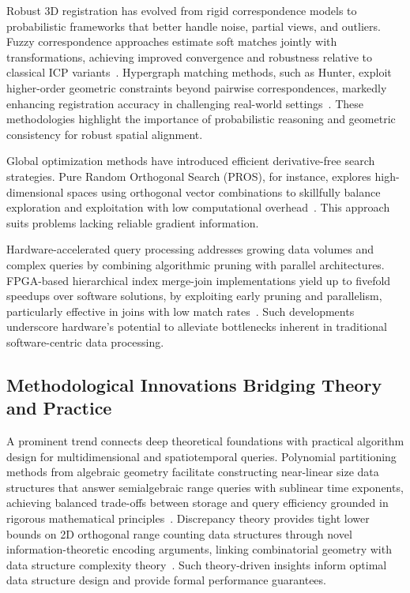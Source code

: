 \documentclass[11pt]{article}
\begin{document}
Robust 3D registration has evolved from rigid correspondence models to probabilistic frameworks that better handle noise, partial views, and outliers. Fuzzy correspondence approaches estimate soft matches jointly with transformations, achieving improved convergence and robustness relative to classical ICP variants~\cite{ref6}. Hypergraph matching methods, such as Hunter, exploit higher-order geometric constraints beyond pairwise correspondences, markedly enhancing registration accuracy in challenging real-world settings~\cite{ref7}. These methodologies highlight the importance of probabilistic reasoning and geometric consistency for robust spatial alignment.

Global optimization methods have introduced efficient derivative-free search strategies. Pure Random Orthogonal Search (PROS), for instance, explores high-dimensional spaces using orthogonal vector combinations to skillfully balance exploration and exploitation with low computational overhead~\cite{ref11}. This approach suits problems lacking reliable gradient information.

Hardware-accelerated query processing addresses growing data volumes and complex queries by combining algorithmic pruning with parallel architectures. FPGA-based hierarchical index merge-join implementations yield up to fivefold speedups over software solutions, by exploiting early pruning and parallelism, particularly effective in joins with low match rates~\cite{ref27}. Such developments underscore hardware’s potential to alleviate bottlenecks inherent in traditional software-centric data processing.

\subsection{Methodological Innovations Bridging Theory and Practice}

A prominent trend connects deep theoretical foundations with practical algorithm design for multidimensional and spatiotemporal queries. Polynomial partitioning methods from algebraic geometry facilitate constructing near-linear size data structures that answer semialgebraic range queries with sublinear time exponents, achieving balanced trade-offs between storage and query efficiency grounded in rigorous mathematical principles~\cite{ref3}. Discrepancy theory provides tight lower bounds on 2D orthogonal range counting data structures through novel information-theoretic encoding arguments, linking combinatorial geometry with data structure complexity theory~\cite{ref1}. Such theory-driven insights inform optimal data structure design and provide formal performance guarantees.
\end{document}
